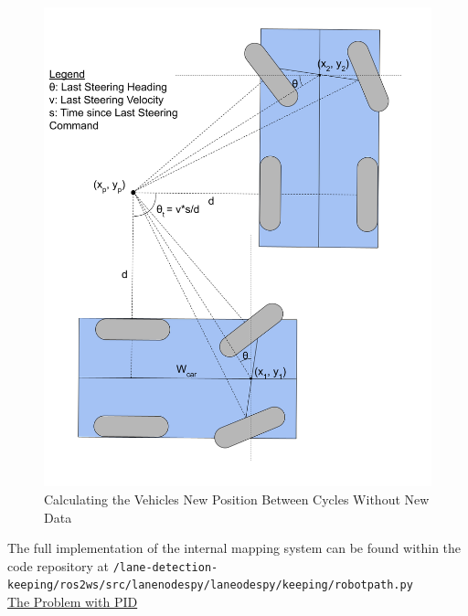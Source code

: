 \documentclass[titlepage,draft]{article}
\begin{document}
{\begin{figure}
	\centering
	\includegraphics[width=5in]{update_description}
	\caption{Calculating the Vehicles New Position Between Cycles Without New Data}
	\label{fig:internal_update_determination}
\end{figure}

The full implementation of the internal mapping system can be found within the code repository at \texttt{/lane-detection-keeping/ros2\textunderscore ws/src/lane\textunderscore nodes\textunderscore py/lane\textunderscore odes\textunderscore py/keeping/robot\textunderscore path.py}
\\

\underline{The Problem with PID}

}
\end{document}
